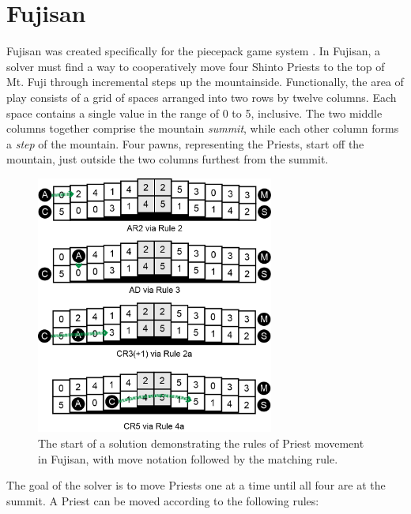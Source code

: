 \documentclass[journal]{IEEEtran}
\begin{document}

\section{Fujisan}
\noindent
Fujisan was created specifically for the piecepack game system \cite{GAMESYSTEM}. In Fujisan, a solver must find a way to cooperatively move four Shinto Priests to the top of Mt. Fuji through incremental steps up the mountainside. Functionally, the area of play consists of a grid of spaces arranged into two rows by twelve columns. Each space contains a single value in the range of 0 to 5, inclusive. The two middle columns together comprise the mountain {\it summit}, while each other column forms a {\it step} of the mountain. Four pawns, representing the Priests, start off the mountain, just outside the two columns furthest from the summit.

\begin{figure}[t]
\centering
\includegraphics[width=7.8cm]{priestrulesfixed1.png}
\caption{The start of a solution demonstrating the rules of Priest movement in Fujisan, with move notation followed by the matching rule. }
\label{fig:priestrules}
\end{figure}

The goal of the solver is to move Priests one at a time until all four are at the summit. A Priest can be moved according to the following rules:  
\end{document}

